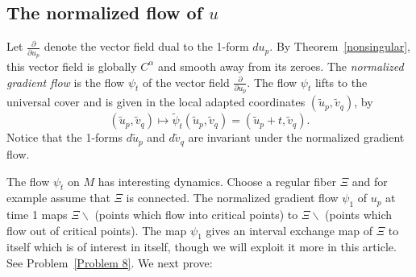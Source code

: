 \documentclass{ip-journal}
\theoremstyle{definition}
\numberwithin{equation}{section}
\begin{document}
\subsection{The normalized flow of $u$}
Let    $\frac{\partial}{\partial u_p}$ denote the vector field dual to the 1-form $du_p$. By Theorem~\ref{nonsingular}, this vector field is globally $C^{\alpha}$ and smooth away from its zeroes. 
 The {\it{normalized gradient flow}} is the flow $\psi_t$  of the vector field $\frac{\partial}{\partial u_p}$. The flow $\psi_t$ lifts to the  universal cover and is given in the 
 local adapted coordinates $(\tilde u_p, \tilde v_q)$,  by
\[ 
(\tilde u_p, \tilde v_q) \mapsto \tilde \psi_t(\tilde u_p, \tilde v_q)=(\tilde u_p+t, \tilde v_q).
\]
Notice that  the  1-forms $d\tilde u_p$ and $d\tilde v_q$ are  invariant under the normalized gradient flow. 

The flow $\psi_t$ on $M$ has interesting dynamics. Choose a regular fiber $\Xi$ and for example assume that $\Xi$ is connected. The normalized gradient flow $\psi_1$ of $u_p$ at time 1 maps $\Xi \backslash$ (points which flow into critical points) to $\Xi \backslash$ (points which flow out of critical points). The map $\psi_1$ gives an interval exchange map of $\Xi$ to itself which is of interest in itself,  though we will exploit it more in this article. See Problem~\ref{Problem 8}.
We next prove:
\end{document}
